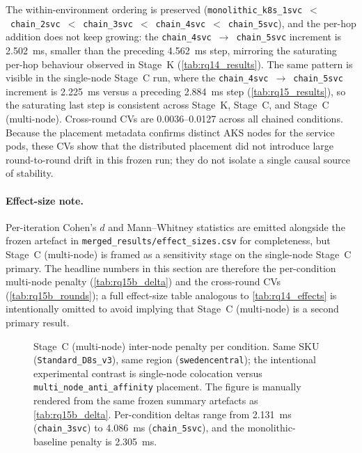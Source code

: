 The within-environment ordering is preserved
(\texttt{monolithic\_k8s\_1svc}~$<$~\texttt{chain\_2svc}~$<$~\texttt{chain\_3svc}~$<$~\texttt{chain\_4svc}~$<$~\texttt{chain\_5svc}),
and the per-hop addition does not keep growing: the
\texttt{chain\_4svc}~$\rightarrow$~\texttt{chain\_5svc} increment is 2.502~ms,
smaller than the preceding 4.562~ms step, mirroring the saturating per-hop
behaviour observed in Stage~K (\cref{tab:rq14_results}). The same pattern is
visible in the single-node Stage~C run, where the
\texttt{chain\_4svc}~$\rightarrow$~\texttt{chain\_5svc} increment is 2.225~ms
versus a preceding 2.884~ms step (\cref{tab:rq15_results}), so the saturating
last step is consistent across Stage~K, Stage~C, and Stage~C (multi-node). Cross-round CVs are
0.0036--0.0127 across all chained conditions. Because the placement metadata
confirms distinct AKS nodes for the service pods, these CVs show that the
distributed placement did not introduce large round-to-round drift in this
frozen run; they do not isolate a single causal source of stability.

\paragraph{Effect-size note.} Per-iteration Cohen's $d$ and Mann--Whitney
statistics are emitted alongside the frozen artefact in
\texttt{merged\_results/effect\_sizes.csv} for completeness, but Stage~C (multi-node) is framed
as a sensitivity stage on the single-node Stage~C primary. The headline numbers in
this section are therefore the per-condition multi-node penalty
(\cref{tab:rq15b_delta}) and the cross-round CVs (\cref{tab:rq15b_rounds}); a
full effect-size table analogous to \cref{tab:rq14_effects} is intentionally
omitted to avoid implying that Stage~C (multi-node) is a second primary result.

\begin{figure}[htbp]
\centering
\resizebox{0.92\textwidth}{!}{%

}
\caption[Stage~C (multi-node) inter-node penalty per condition]{Stage~C (multi-node) inter-node penalty per condition. Same SKU
(\texttt{Standard\_D8s\_v3}), same region (\texttt{swedencentral}); the
intentional experimental contrast is single-node colocation versus
\texttt{multi\_node\_anti\_affinity} placement. The figure is manually
rendered from the same frozen summary artefacts as \cref{tab:rq15b_delta}.
Per-condition deltas range
from 2.131~ms (\texttt{chain\_3svc}) to 4.086~ms (\texttt{chain\_5svc}), and
the monolithic-baseline penalty is 2.305~ms.}
\label{fig:rq15b_multinode_delta}
\end{figure}

